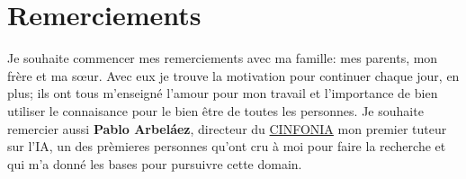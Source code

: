 \chapter*{Remerciements}
\noindent Je souhaite commencer mes remerciements avec ma famille: mes parents, mon frère et ma s\oe ur. Avec 
eux je trouve la motivation pour continuer chaque jour, en plus; ils ont tous m'enseigné l'amour pour 
mon travail et l'importance de bien utiliser le connaisance pour le bien être de toutes les personnes. 
Je souhaite remercier aussi \textbf{Pablo Arbeláez}, directeur du \href{https://cinfonia.uniandes.edu.co/}{CINFONIA} 
mon premier tuteur sur l'IA, un des prèmieres personnes qu'ont cru à moi pour faire la recherche et qui m'a 
donné les bases pour pursuivre cette domain. 

